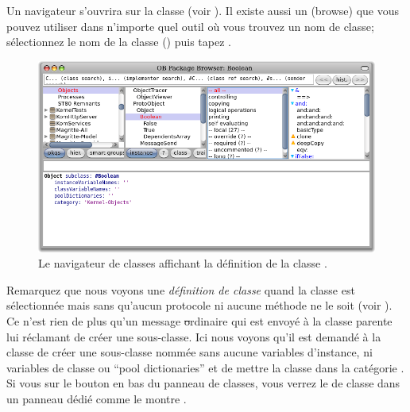 \documentclass[a4paper,10pt,twoside]{book}
\begin{document}
Un navigateur s'ouvrira sur la classe  (voir ).
Il existe aussi un   (browse) que vous
pouvez utiliser dans n'importe quel outil où vous trouvez un nom de
classe;
sélectionnez le nom de la classe 
(\parex \mbox{)}
puis tapez .


\begin{figure}[hbt]
	{\centerline {\includegraphics[width=\textwidth]{Kernel-objects-boolean}}}
\caption{Le navigateur de classes affichant la définition de la
  classe \mbox{.}}
\end{figure}

Remarquez que nous voyons une \emph{définition de classe}
quand la classe \mbox{} est sélectionnée mais sans qu'aucun
protocole ni aucune méthode ne le soit
(voir ).
Ce n'est rien de plus qu'un message \st ordinaire qui est envoyé à
la classe parente lui réclamant de créer une sous-classe.
Ici nous voyons qu'il est demandé à la classe  de
créer une sous-classe nommée  sans aucune variables
d'instance, ni variables de classe ou ``pool dictionaries'' et de 
mettre la classe  dans la catégorie .
Si vous \clickz{} sur le bouton  en bas du panneau
de classes, vous verrez le  de classe
dans un panneau dédié comme le montre . %
\end{document}
